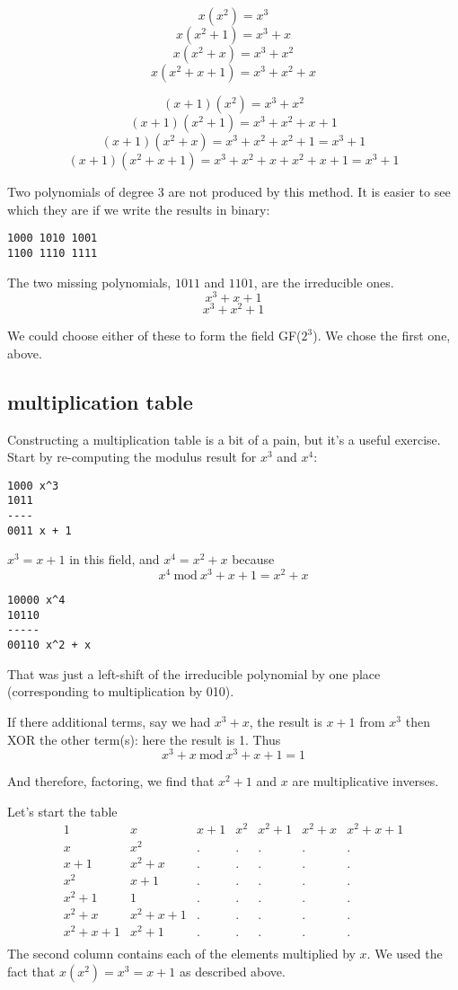 \documentclass[11pt, oneside]{article}
\begin{document}
\[ x(x^2) = x^3 \]
\[ x(x^2 + 1) = x^3 + x  \]
\[ x(x^2 + x) = x^3 + x^2 \]
\[ x(x^2 + x + 1) = x^3 + x^2 + x  \]

\[ (x+1)(x^2) = x^3 + x^2   \]
\[ (x+1)(x^2 + 1) =  x^3 + x^2 + x + 1 \]
\[ (x+1)(x^2 + x) = x^3 + x^2 + x^2 + 1 =  x^3 + 1 \]
\[ (x+1)(x^2 + x + 1) = x^3 + x^2 + x + x^2 + x + 1 = x^3 + 1 \]

Two polynomials of degree 3 are not produced by this method.  It is easier to see which they are if we write the results in binary:
\begin{verbatim}
1000 1010 1001
1100 1110 1111
\end{verbatim}

The two missing polynomials, $1011$ and $1101$, are the irreducible ones.
\[ x^3 + x + 1 \]
\[ x^3 + x^2 + 1 \]

We could choose either of these to form the field GF($2^3$).  We chose the first one, above.

\subsection*{multiplication table}
Constructing a multiplication table is a bit of a pain, but it's a useful exercise.  Start by re-computing the modulus result for $x^3$ and $x^4$:
\begin{verbatim}
1000 x^3
1011
----
0011 x + 1
\end{verbatim}

$x^3 = x + 1$ in this field, and $x^4 = x^2 + x$ because
\[ x^4 \ \text{mod} \ x^3 + x + 1 = x^2 + x \]

\begin{verbatim}
10000 x^4
10110
-----
00110 x^2 + x
\end{verbatim}

That was just a left-shift of the irreducible polynomial by one place (corresponding to multiplication by 010).

If there additional terms, say we had $x^3 + x$, the result is $x + 1$ from $x^3$ then XOR the other term(s):  here the result is 1.  Thus
\[ x^3 + x  \ \text{mod} \ x^3 + x + 1 = 1 \]

And therefore, factoring, we find that $x^2 + 1$ and $x$ are multiplicative inverses.

Let's start the table
\[ 
\begin{matrix}
1 & x & x + 1 & x^2 & x^2 + 1 & x^2 + x & x^2 + x + 1 \\
x & x^2 & . & . & . &.  & . \\
x + 1 & x^2 + x & . & . & . & . & . \\
x^2 & x + 1  & . & . & . & . & . \\
x^2 + 1 & 1  & . & . & . & . & . \\
x^2 + x & x^2 + x + 1   & . & . & . & . & . \\
x^2 + x + 1 & x^2 + 1 & . & . & . & . & . \\
\end{matrix} 
\]
The second column contains each of the elements multiplied by $x$.  We used the fact that $x(x^2) = x^3 = x + 1$ as described above.
\end{document}
